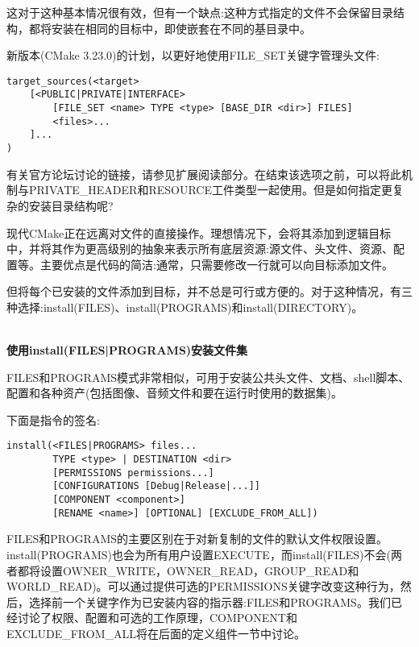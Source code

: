 这对于这种基本情况很有效，但有一个缺点:这种方式指定的文件不会保留目录结构，都将安装在相同的目标中，即使嵌套在不同的基目录中。

新版本(CMake 3.23.0)的计划，以更好地使用FILE\_SET关键字管理头文件:

\begin{lstlisting}[style=styleCMake]
target_sources(<target>
	[<PUBLIC|PRIVATE|INTERFACE>
		[FILE_SET <name> TYPE <type> [BASE_DIR <dir>] FILES]
		<files>...
	]...
)
\end{lstlisting}

有关官方论坛讨论的链接，请参见扩展阅读部分。在结束该选项之前，可以将此机制与PRIVATE\_HEADER和RESOURCE工件类型一起使用。但是如何指定更复杂的安装目录结构呢?


现代CMake正在远离对文件的直接操作。理想情况下，会将其添加到逻辑目标中，并将其作为更高级别的抽象来表示所有底层资源:源文件、头文件、资源、配置等。主要优点是代码的简洁:通常，只需要修改一行就可以向目标添加文件。

但将每个已安装的文件添加到目标，并不总是可行或方便的。对于这种情况，有三种选择:install(FILES)、install(PROGRAMS)和install(DIRECTORY)。

\hspace*{\fill} \\ %
\noindent
\textbf{使用install(FILES|PROGRAMS)安装文件集}

FILES和PROGRAMS模式非常相似，可用于安装公共头文件、文档、shell脚本、配置和各种资产(包括图像、音频文件和要在运行时使用的数据集)。

下面是指令的签名:

\begin{lstlisting}[style=styleCMake]
install(<FILES|PROGRAMS> files...
		TYPE <type> | DESTINATION <dir>
		[PERMISSIONS permissions...]
		[CONFIGURATIONS [Debug|Release|...]]
		[COMPONENT <component>]
		[RENAME <name>] [OPTIONAL] [EXCLUDE_FROM_ALL])
\end{lstlisting}

FILES和PROGRAMS的主要区别在于对新复制的文件的默认文件权限设置。install(PROGRAMS)也会为所有用户设置EXECUTE，而install(FILES)不会(两者都将设置OWNER\_WRITE，OWNER\_READ，GROUP\_READ和WORLD\_READ)。可以通过提供可选的PERMISSIONS关键字改变这种行为，然后，选择前一个关键字作为已安装内容的指示器:FILES和PROGRAMS。我们已经讨论了权限、配置和可选的工作原理，COMPONENT和EXCLUDE\_FROM\_ALL将在后面的定义组件一节中讨论。


